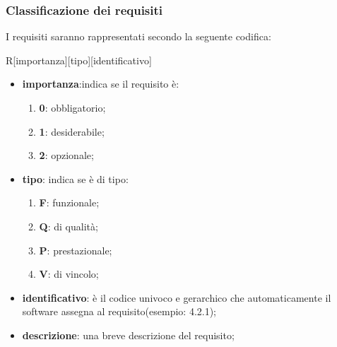 		\subsubsection{Classificazione  dei requisiti}
		I requisiti saranno rappresentati secondo la seguente codifica:
		\begin{center}
			R[importanza][tipo][identificativo]
		\end{center}
		\begin{itemize}
			\item \textbf{importanza}:indica se il requisito è:
			\begin{enumerate}
				\item \textbf{0}: obbligatorio;
				\item \textbf{1}: desiderabile;
				\item \textbf{2}: opzionale;
			\end{enumerate}
			\item \textbf{tipo}: indica se è di tipo:
			\begin{enumerate}
				\item \textbf{F}: funzionale;
				\item \textbf{Q}: di qualità;
				\item \textbf{P}: prestazionale;
				\item \textbf{V}: di vincolo;
			\end{enumerate}
			\item \textbf{identificativo}: è il codice univoco e gerarchico che automaticamente il software assegna al requisito(esempio: 4.2.1);
			\item \textbf{descrizione}: una breve descrizione del requisito;
		\end{itemize}
